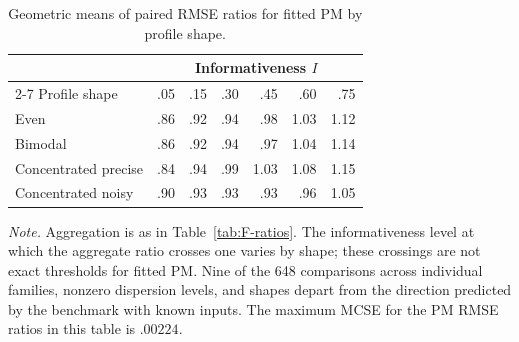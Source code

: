 \begin{table}[!ht]
\caption{Geometric means of paired RMSE ratios for fitted PM by profile shape.}
\label{tab:F-shapes}
\centering
\begin{tablebody}
\begin{tabular}{@{}lrrrrrr@{}}
\toprule
& \multicolumn{6}{c}{Informativeness $I$} \\
\cmidrule(lr){2-7}
Profile shape & .05 & .15 & .30 & .45 & .60 & .75 \\
\midrule
Even & .86 & .92 & .94 & .98 & 1.03 & 1.12 \\
\addlinespace[5pt]
Bimodal & .86 & .92 & .94 & .97 & 1.04 & 1.14 \\
\addlinespace[5pt]
Concentrated precise & .84 & .94 & .99 & 1.03 & 1.08 & 1.15 \\
\addlinespace[5pt]
Concentrated noisy & .90 & .93 & .93 & .93 & .96 & 1.05 \\
\bottomrule
\end{tabular}
\end{tablebody}
\par\vspace{0.4\baselineskip}
\begin{minipage}{\linewidth}\normalsize\doublespacing\raggedright
\textit{Note.} Aggregation is as in Table~\ref{tab:F-ratios}. The informativeness level at which the aggregate ratio crosses one varies by shape; these crossings are not exact thresholds for fitted PM. Nine of the 648 comparisons across individual families, nonzero dispersion levels, and shapes depart from the direction predicted by the benchmark with known inputs. The maximum MCSE for the PM RMSE ratios in this table is $.00224$.
\end{minipage}
\end{table}
